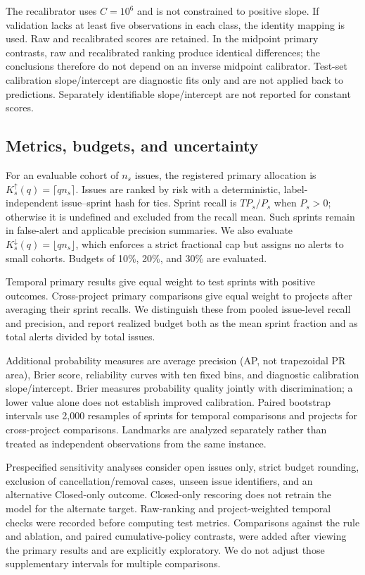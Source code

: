 The recalibrator uses \(C=10^6\) and is not constrained to positive slope. If validation lacks at least five observations in each class, the identity mapping is used. Raw and recalibrated scores are retained. In the midpoint primary contrasts, raw and recalibrated ranking produce identical differences; the conclusions therefore do not depend on an inverse midpoint calibrator. Test-set calibration slope/intercept are diagnostic fits only and are not applied back to predictions. Separately identifiable slope/intercept are not reported for constant scores.

\subsection{Metrics, budgets, and uncertainty}\label{metrics-budgets-and-uncertainty}

For an evaluable cohort of \(n_s\) issues, the registered primary allocation is \(K_s^{\uparrow}(q)=\lceil qn_s\rceil\). Issues are ranked by risk with a deterministic, label-independent issue--sprint hash for ties. Sprint recall is \(TP_s/P_s\) when \(P_s>0\); otherwise it is undefined and excluded from the recall mean. Such sprints remain in false-alert and applicable precision summaries. We also evaluate \(K_s^{\downarrow}(q)=\lfloor qn_s\rfloor\), which enforces a strict fractional cap but assigns no alerts to small cohorts. Budgets of 10\%, 20\%, and 30\% are evaluated.

Temporal primary results give equal weight to test sprints with positive outcomes. Cross-project primary comparisons give equal weight to projects after averaging their sprint recalls. We distinguish these from pooled issue-level recall and precision, and report realized budget both as the mean sprint fraction and as total alerts divided by total issues.

Additional probability measures are average precision (AP, not trapezoidal PR area), Brier score, reliability curves with ten fixed bins, and diagnostic calibration slope/intercept. Brier measures probability quality jointly with discrimination; a lower value alone does not establish improved calibration. Paired bootstrap intervals use 2,000 resamples of sprints for temporal comparisons and projects for cross-project comparisons. Landmarks are analyzed separately rather than treated as independent observations from the same instance.

Prespecified sensitivity analyses consider open issues only, strict budget rounding, exclusion of cancellation/removal cases, unseen issue identifiers, and an alternative Closed-only outcome. Closed-only rescoring does not retrain the model for the alternate target. Raw-ranking and project-weighted temporal checks were recorded before computing test metrics. Comparisons against the rule and ablation, and paired cumulative-policy contrasts, were added after viewing the primary results and are explicitly exploratory. We do not adjust those supplementary intervals for multiple comparisons.

